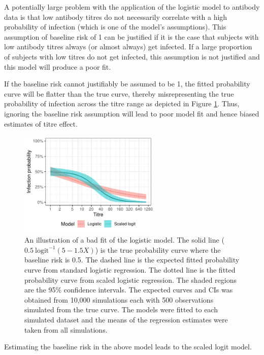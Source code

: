 A potentially large problem with the application of the logistic model to antibody data is that low antibody titres do not necessarily correlate with a high probability of infection (which is one of the model's assumptions). This assumption of baseline risk of 1 can be justified if it is the case that subjects with low antibody titres always (or almost always) get infected. If a large proportion of subjects with low titres do not get infected, this assumption is not justified and this model will produce a poor fit.

If the baseline risk cannot justifiably be assumed to be 1, the fitted probability curve will be flatter than the true curve, thereby misrepresenting the true probability of infection across the titre range as depicted in Figure \ref{LogisticFit}. Thus, ignoring the baseline risk assumption will lead to poor model fit and hence biased estimates of titre effect.

\begin{figure}[htp]
	\centering
	\includegraphics[width=0.6\textwidth]{../logistic-plot/predsplot.pdf}
	\caption{
		An illustration of a bad fit of the logistic model. The solid line ($0.5\ \text{logit}^{-1}(5 - 1.5 X)$) is the true probability curve where the baseline risk is 0.5. The dashed line is the expected fitted probability curve from standard logistic regression. The dotted line is the fitted probability curve from scaled logistic regression. The shaded regions are the 95\% confidence intervals. The expected curves and CIs was obtained from 10,000 simulations each with 500 observations simulated from the true curve. The models were fitted to each simulated dataset and the means of the regression estimates were taken from all simulations.
	}
	\label{LogisticFit}
\end{figure}

Estimating the baseline risk in the above model leads to the scaled logit model.
